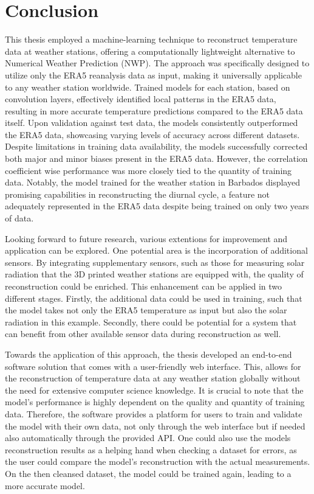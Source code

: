 \section{Conclusion}
\label{sec: conclusion}

This thesis employed a machine-learning technique to reconstruct temperature data at weather stations, offering a computationally lightweight alternative to Numerical Weather Prediction (NWP).
The approach was specifically designed to utilize only the ERA5 reanalysis data as input, making it universally applicable to any weather station worldwide.
Trained models for each station, based on convolution layers, effectively identified local patterns in the ERA5 data, resulting in more accurate temperature predictions compared to the ERA5 data itself.
Upon validation against test data, the models consistently outperformed the ERA5 data, showcasing varying levels of accuracy across different datasets.
Despite limitations in training data availability, the models successfully corrected both major and minor biases present in the ERA5 data. However, the correlation coefficient wise performance was more closely tied to the quantity of training data.
Notably, the model trained for the weather station in Barbados displayed promising capabilities in reconstructing the diurnal cycle, a feature not adequately represented in the ERA5 data despite being trained on only two years of data.

Looking forward to future research, various extentions for improvement and application can be explored.
One potential area is the incorporation of additional sensors.
By integrating supplementary sensors, such as those for measuring solar radiation that the 3D printed weather stations are equipped with, the quality of reconstruction could be enriched.
This enhancement can be applied in two different stages.
Firstly, the additional data could be used in training, such that the model takes not only the ERA5 temperature as input but also the solar radiation in this example.
Secondly, there could be potential for a system that can benefit from other available sensor data during reconstruction as well. 

Towards the application of this approach, the thesis developed an end-to-end software solution that comes with a user-friendly web interface.
This, allows for the reconstruction of temperature data at any weather station globally without the need for extensive computer science knowledge.
It is crucial to note that the model's performance is highly dependent on the quality and quantity of training data.
Therefore, the software provides a platform for users to train and validate the model with their own data, not only through the web interface but if needed also automatically through the provided API.
One could also use the models reconstruction results as a helping hand when checking a dataset for errors, as the user could compare the model's reconstruction with the actual measurements.
On the then cleansed dataset, the model could be trained again, leading to a more accurate model.


